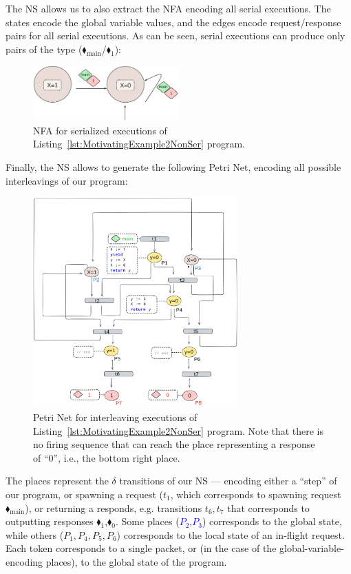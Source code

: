 %
The NS allows us to also extract the NFA encoding all serial executions. The states encode the global variable values, and the edges encode request/response pairs for all serial executions. As can be seen, serial executions can produce only pairs of the type ({\color{ForestGreen}$\blacklozenge_\text{main}$/{\color{red}$\blacklozenge_1$}}):

\begin{figure}[H]
	\centering
	\includegraphics[width=0.5\textwidth]{plots/code_2_NFA.png}
	\caption{NFA for serialized executions of Listing~\ref{lst:MotivatingExample2NonSer} program.}
	\label{fig:code2ExampleNFA}
\end{figure}

Finally, the NS allows to generate the following Petri Net, encoding all possible interleavings of our program:

\begin{figure}[H]
	\centering
	\includegraphics[width=0.7\textwidth]{plots/code_2_PN_with_annotation.png}
	\caption{Petri Net for interleaving executions of Listing~\ref{lst:MotivatingExample2NonSer} program. Note that there is no firing sequence that can reach the place representing a response of ``0'', i.e., the bottom right place.}
	\label{fig:code2ExamplePN}
\end{figure}

The places represent the $\delta$ transitions of our NS --- encoding either a ``step'' of our program, or spawning a request ($t_1$, which  corresponds to spawning request {\color{ForestGreen}$\blacklozenge_\text{main}$}), or returning a responds, e.g. transitions $t_6,t_7$ that corresponds to outputting responses {\color{red}$\blacklozenge_1$},{\color{red}$\blacklozenge_0$}.
%
Some places (\textcolor{blue}{$P_2$},\textcolor{blue}{$P_3$}) corresponds to the global state, while others ($P_1,P_4,P_5,P_6$) corresponds to the local state of an in-flight request.
%
Each token corresponds to a single packet, or (in the case of the global-variable-encoding places), to the global state of the program.




